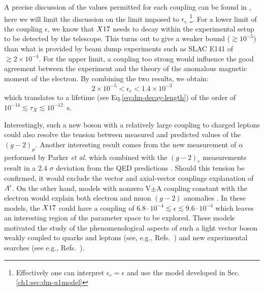 A precise discussion of the values permitted for each coupling can be found in \cite{Feng:2016jff,PhysRevD.95.035017}, here we will limit the discussion on the limit imposed to $\epsilon_e$ \footnote{Effectively one can interpret $\epsilon_e = \epsilon$ and use the model developed in Sec.\ref{ch1:sec:dm-u1model}}. For a lower limit of the coupling $\epsilon$, we know that $X17$ needs to decay within the experimental setup to be detected by the telescope. This turns out to give a weaker bound ($\gtrsim 10^{-5}$) than what is provided by beam dump experiments such as SLAC E141 \cite{blum} of $\gtrsim 2 \times 10^{-4}$. For the upper limit, a coupling too strong would influence the good agreement between the experiment and the theory of the anomalous magnetic moment of the electron. By combining the two results, we obtain:
\begin{equation}
  \label{eq:x17-limits}
  2 \times 10^{-5} < \epsilon_e < 1.4 \times 10^{-3}
\end{equation}
which translates to a lifetime (see Eq.\ref{eq:dm-decay-length}) of the order of $10^{-14}\lesssim \tau_X \lesssim 10^{-12}$~s.

Interestingly, such a new boson with a relatively large coupling to charged leptons could also resolve the tension between measured and predicted values of the $(g - 2)_{\mu}$. Another interesting result comes from the new measurement of $\alpha$ performed by Parker \textit{et al.} \cite{Parker191} which combined with the $(g-2)_e$ measurements result in a 2.4 $\sigma$ deviation from the QED predictions \cite{PhysRevLett.100.120801}. Should this tension be confirmed, it would exclude the vector and axial-vector couplings explanation of $A'$. On the other hand, models with nonzero V$\pm$A coupling constant with the electron would explain both electron and muon $(g - 2)$ anomalies \cite{Krasnikov:2019dgh}. In these models, the $X17$ could have a coupling of $6.8\cdot 10^{-4} \lesssim \epsilon \lesssim 9.6 \cdot 10^{-4}$ which leaves an interesting region of the parameter space to be explored. These models motivated the study of the phenomenological aspects of such a light vector boson weakly coupled to quarks and leptons (see, e.g., Refs.~\cite{fayet1, fayet2, fayet3, fayet4,jk, cheng, Zhang:2017zap, ia, liang, bart}) and new experimental searches (see e.g., Refs.~\cite{battaglieri2017cosmic, nardi}).

